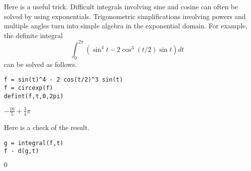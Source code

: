 
\bigskip
\noindent
Here is a useful trick.
Difficult integrals involving sine and cosine
can often be solved by using exponentials.
Trigonometric simplifications involving powers
and multiple angles turn into simple algebra in the
exponential domain.
For example, the definite integral
$$\int_0^{2\pi}\left(\sin^4t-2\cos^3(t/2)\sin t\right)dt$$
can be solved as follows.

\begin{Verbatim}[formatcom=\color{blue},samepage=true]
f = sin(t)^4 - 2 cos(t/2)^3 sin(t)
f = circexp(f)
defint(f,t,0,2pi)
\end{Verbatim}

\noindent
$\displaystyle -\tfrac{16}{5}+\tfrac{3}{4}\pi$

\bigskip
\noindent
Here is a check of the result.

\begin{Verbatim}[formatcom=\color{blue},samepage=true]
g = integral(f,t)
f - d(g,t)
\end{Verbatim}

\noindent
$\displaystyle 0$
